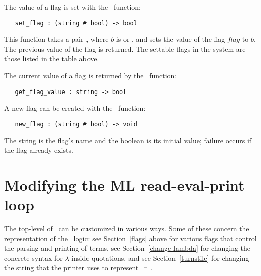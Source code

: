 The value of a flag is set with the \ML\ function:

\begin{boxed}
\begin{verbatim}
   set_flag : (string # bool) -> bool
\end{verbatim}\end{boxed}

\noindent This function takes a pair ,
 where $b$ is  or , and
sets the value of the flag $flag$ to $b$. The previous value of the flag is
returned.
The settable flags in the system are those listed in the table above.


The current value of a flag is returned by the \ML\ function:

\begin{boxed}
\begin{verbatim}
   get_flag_value : string -> bool
\end{verbatim}\end{boxed}


A new flag can be created with the \ML\ function:

\begin{boxed}
\begin{verbatim}
   new_flag : (string # bool) -> void
\end{verbatim}\end{boxed}

\noindent The string is the flag's name and the boolean is its initial value;
failure occurs if the flag already exists.

\section{Modifying the ML read-eval-print loop}

The top-level
 of \ML\ can be customized in various ways.  Some of these concern
the representation  of  the  \HOL\  logic:   see  Section~\ref{flags} above for
various flags that control the parsing and printing of terms, see
Section~\ref{change-lambda} for changing the concrete syntax for $\lambda$
inside quotations, and see Section~\ref{turnstile} for changing the string
that the printer uses to represent $\ \vdash\ $.


